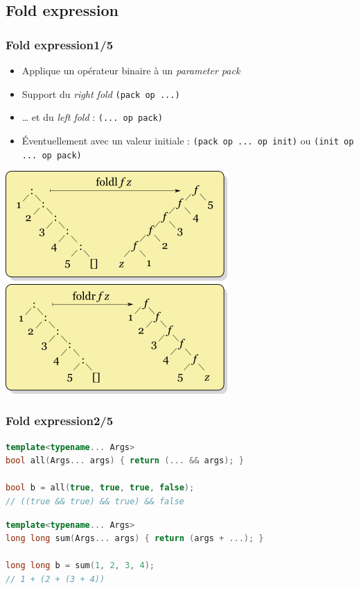 \documentclass[C++.tex]{subfiles}
\begin{document}
\subsection*{Fold expression}
\begin{frame}[fragile]
	\frametitle{Fold expression\titlehfill{}1/5}
	\begin{itemize}
		\item Applique un opérateur binaire à un \textit{parameter pack}
		\item Support du \textit{right fold} \lstinline|(pack op ...)|
		\item \ldots{} et du \textit{left fold} : \lstinline|(... op pack)|
		\item Éventuellement avec un valeur initiale : \lstinline|(pack op ... op init)| ou \lstinline|(init op ... op pack)|
	\end{itemize}

	\begin{center}
		\includegraphics[height=0.30\textheight]{input_src/Left-fold-transformation.png} \includegraphics[height=0.30\textheight]{input_src/Right-fold-transformation.png}
	\end{center}
\end{frame}

\begin{frame}[fragile]
	\frametitle{Fold expression\titlehfill{}2/5}
	\begin{lstlisting}[language=C++]
template<typename... Args>
bool all(Args... args) { return (... && args); }

bool b = all(true, true, true, false);
// ((true && true) && true) && false\end{lstlisting}

	\begin{lstlisting}[language=C++]
template<typename... Args>
long long sum(Args... args) { return (args + ...); }

long long b = sum(1, 2, 3, 4);
// 1 + (2 + (3 + 4))\end{lstlisting}
\end{frame}
\end{document}
